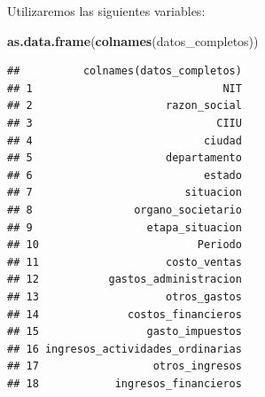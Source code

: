 \documentclass[
  11pt,
  a4paper,
]{book}
\newenvironment{Shaded}{\begin{snugshade}}{\end{snugshade}}
\newcommand{\CommentTok}[1]{\textcolor[rgb]{0.56,0.35,0.01}{\textit{#1}}}
\newcommand{\DataTypeTok}[1]{\textcolor[rgb]{0.13,0.29,0.53}{#1}}
\newcommand{\DecValTok}[1]{\textcolor[rgb]{0.00,0.00,0.81}{#1}}
\newcommand{\KeywordTok}[1]{\textcolor[rgb]{0.13,0.29,0.53}{\textbf{#1}}}
\newcommand{\NormalTok}[1]{#1}
\newcommand{\OperatorTok}[1]{\textcolor[rgb]{0.81,0.36,0.00}{\textbf{#1}}}
\newcommand{\StringTok}[1]{\textcolor[rgb]{0.31,0.60,0.02}{#1}}
\begin{document}
\begin{Shaded}
\end{Shaded}

Utilizaremos las siguientes variables:

\begin{Shaded}
\begin{Highlighting}[]
\KeywordTok{as.data.frame}\NormalTok{(}\KeywordTok{colnames}\NormalTok{(datos_completos))}
\end{Highlighting}
\end{Shaded}

\begin{verbatim}
##          colnames(datos_completos)
## 1                              NIT
## 2                     razon_social
## 3                             CIIU
## 4                           ciudad
## 5                     departamento
## 6                           estado
## 7                        situacion
## 8                organo_societario
## 9                  etapa_situacion
## 10                         Periodo
## 11                    costo_ventas
## 12           gastos_administracion
## 13                    otros_gastos
## 14              costos_financieros
## 15                 gasto_impuestos
## 16 ingresos_actividades_ordinarias
## 17                  otros_ingresos
## 18            ingresos_financieros
\end{verbatim}
\end{document}
